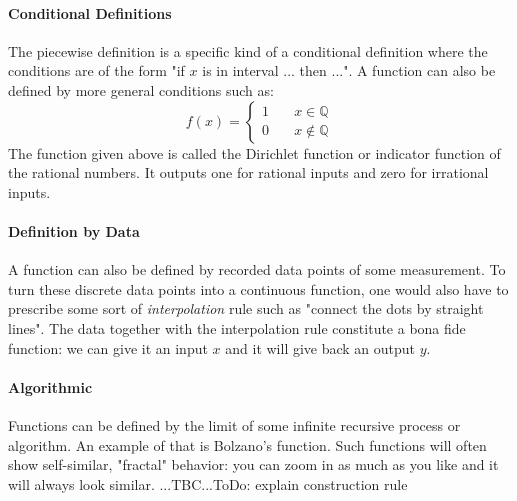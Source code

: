 
\paragraph{Conditional Definitions}
The piecewise definition is a specific kind of a conditional definition where the conditions are of the form "if $x$ is in interval ... then ...". A function can also be defined by more general conditions such as:
\begin{equation}
f(x) = 
\begin{cases} 
 1 \quad& x \in    \mathbb{Q} \\
 0      & x \notin \mathbb{Q}
\end{cases}
\end{equation}
The function given above is called the Dirichlet function or indicator function of the rational numbers. It outputs one for rational inputs and zero for irrational inputs.

\paragraph{Definition by Data}
A function can also be defined by recorded data points of some measurement. To turn these discrete data points into a continuous function, one would also have to prescribe some sort of \emph{interpolation} rule such as "connect the dots by straight lines". The data together with the interpolation rule constitute a bona fide function: we can give it an input $x$ and it will give back an output $y$. 

\paragraph{Algorithmic}
Functions can be defined by the limit of some infinite recursive process or algorithm. An example of that is Bolzano's function. Such functions will often show self-similar, "fractal" behavior: you can zoom in as much as you like and it will always look similar. 
...TBC...ToDo: explain construction rule

